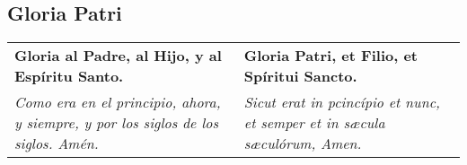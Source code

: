 \documentclass[./devocionario.tex]{subfiles}
\begin{document}
    \subsection*{Gloria Patri}
    \begin{tabular} { p{} p{} }
        \textbf{Gloria al Padre, al Hijo, y al Espíritu Santo.} 
        
        &

        \textbf{Gloria Patri, et Filio, et Spíritui Sancto.}\\
        
        \textit{Como era en el principio, ahora, y siempre, y por los siglos de los siglos. Amén.}
        
        &

        \textit{Sicut erat in pcincípio et nunc, et semper et in sæcula sæculórum, Amen.}
    \end{tabular}
\end{document}
